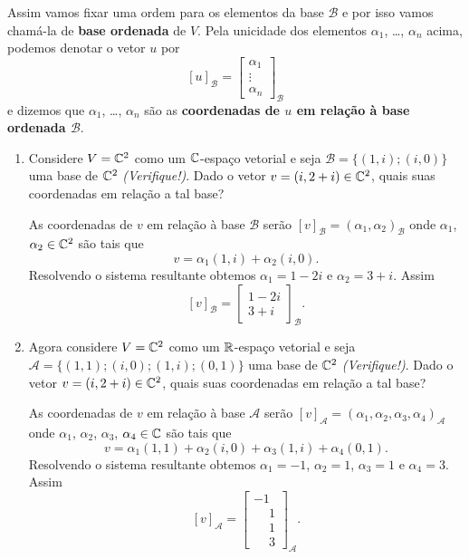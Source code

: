 Assim vamos fixar uma ordem para os elementos da base $\mathcal{B}$ e por isso vamos cham\'a-la de \textbf{base ordenada} de $V$. Pela unicidade dos elementos $\alpha_1$, \dots, $\alpha_n$ acima, podemos denotar o vetor $u$ por
\[
	[u]_\mathcal{B} = \begin{bmatrix}
		\alpha_1\\
		\vdots\\
		\alpha_n
	\end{bmatrix}_\mathcal{B}
\]
e dizemos que $\alpha_1$, \dots, $\alpha_n$ s\~ao as \textbf{coordenadas de $u$ em rela\c{c}\~ao \`a base ordenada $\mathcal{B}$}.

\begin{exemplos}
	\begin{enumerate}[label={\arabic*})]
		\item Considere $V = \mathbb{C}^2$ como um $\mathbb{C}$-espa\c{c}o vetorial e seja $\mathcal{B} = \{(1,i);(i,0)\}$ uma base de $\mathbb{C}^2$ \textit{(Verifique!)}. Dado o vetor $v = (i, 2+i) \in \mathbb{C}^2$, quais suas coordenadas em rela\c{c}\~ao a tal base?
		\begin{solucao}
			As coordenadas de $v$ em rela\c{c}\~ao \`a base $\mathcal{B}$ ser\~ao $[v]_\mathcal{B} = (\alpha_1,\alpha_2)_\mathcal{B}$ onde $\alpha_1$, $\alpha_2 \in \mathbb{C}^2$ s\~ao tais que
			\[
				v = \alpha_1(1,i) + \alpha_2(i,0).
			\]
			Resolvendo o sistema resultante obtemos $\alpha_1 = 1 - 2i$ e $\alpha_2 = 3 + i$. Assim
			\[
				[v]_\mathcal{B} = \begin{bmatrix}
					1 - 2i\\
					3 + i
				\end{bmatrix}_\mathcal{B}.
			\]
		\end{solucao}

		\item Agora considere $V = \mathbb{C}^2$ como um $\mathbb{R}$-espa\c{c}o vetorial e seja $\mathcal{A} = \{(1,1);(i,0);(1,i);(0,1)\}$ uma base de $\mathbb{C}^2$ \textit{(Verifique!)}. Dado o vetor $v = (i,2+i) \in \mathbb{C}^2$, quais suas coordenadas em rela\c{c}\~ao a tal base?
		\begin{solucao}
			As coordenadas de $v$ em rela\c{c}\~ao \`a base $\mathcal{A}$ ser\~ao $[v]_\mathcal{A} = (\alpha_1,\alpha_2,\alpha_3,\alpha_4)_\mathcal{A}$ onde $\alpha_1$, $\alpha_2$, $\alpha_3$, $\alpha_4 \in \mathbb{C}$ s\~ao tais que
			\[
				v = \alpha_1(1,1) + \alpha_2(i,0) + \alpha_3(1,i) + \alpha_4(0,1).
			\]
			Resolvendo o sistema resultante obtemos $\alpha_1 = -1$, $\alpha_2 = 1$, $\alpha_3 = 1$ e $\alpha_4 = 3$. Assim
			\[
				[v]_\mathcal{A} = \begin{bmatrix}
					-1\\
					\phantom{-}1\\
					\phantom{-}1\\
					\phantom{-}3
				\end{bmatrix}_\mathcal{A}.
			\]
		\end{solucao}
	\end{enumerate}
\end{exemplos}

